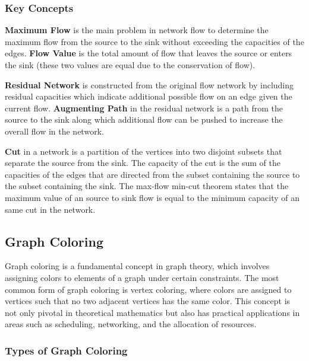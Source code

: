 \documentclass[12pt]{article}
\begin{document}
    \subsubsection{Key Concepts}

    \textbf{Maximum Flow} is the main problem in network flow to determine the
    maximum flow from the source to the sink without exceeding the capacities
    of the edges. \textbf{Flow Value} is the total amount of flow that leaves
    the source or enters the sink (these two values are equal due to the
    conservation of flow).
    
    \textbf{Residual Network} is constructed from the original flow network by
    including residual capacities which indicate additional possible flow on an
    edge given the current flow. \textbf{Augmenting Path} in the residual network
    is a path from the source to the sink along which additional flow can be pushed
    to increase the overall flow in the network.
    
    \textbf{Cut} in a network is a partition of the vertices into two disjoint subsets
    that separate the source from the sink. The capacity of the cut is the sum of
    the capacities of the edges that are directed from the subset containing the
    source to the subset containing the sink. The max-flow min-cut theorem states
    that the maximum value of an source to sink flow is equal to the minimum
    capacity of an same cut in the network.
    
    \subsection{Graph Coloring}
    Graph coloring is a fundamental concept in graph theory, which involves assigning
    colors to elements of a graph under certain constraints. The most common form
    of graph coloring is vertex coloring, where colors are assigned to vertices
    such that no two adjacent vertices has the same color. This concept
    is not only pivotal in theoretical mathematics but also has practical
    applications in areas such as scheduling, networking, and the allocation
    of resources.

    \subsubsection{Types of Graph Coloring}\label{color}
\end{document}
